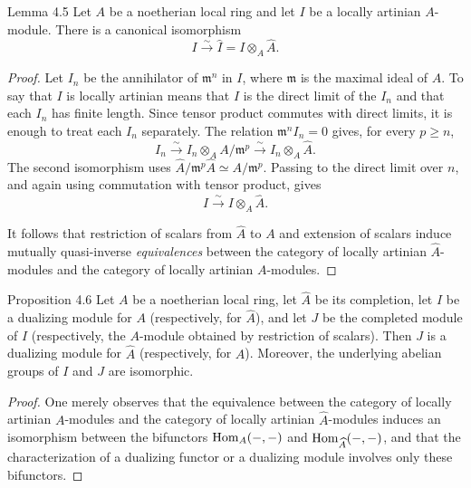 \begin{sgastatement}{Lemma 4.5}
Let $A$ be a noetherian local ring and let $I$ be a locally artinian
$A$-module. There is a canonical isomorphism
\[
  I\xrightarrow{\sim}\widehat I=I\otimes_A\widehat A.
\]
\end{sgastatement}

\begin{proof}
Let $I_n$ be the annihilator of $\mathfrak m^n$ in $I$, where
$\mathfrak m$ is the maximal ideal of $A$. To say that $I$ is locally
artinian means that $I$ is the direct limit of the $I_n$ and that each
$I_n$ has finite length. Since tensor product commutes with direct
limits, it is enough to treat each $I_n$ separately. The relation
$\mathfrak m^nI_n=0$ gives, for every $p\geq n$,
\[
  I_n\xrightarrow{\sim}I_n\otimes_A A/\mathfrak m^p
      \xrightarrow{\sim}I_n\otimes_A\widehat A.
\]
The second isomorphism uses
$\widehat A/\mathfrak m^p\widehat A\simeq A/\mathfrak m^p$. Passing
to the direct limit over $n$, and again using commutation with tensor
product, gives
\[ I\xrightarrow{\sim}I\otimes_A\widehat A. \]

It follows that restriction of scalars from $\widehat A$ to
$A$ and extension of scalars induce mutually quasi-inverse
\emph{equivalences} between the category of locally artinian
$\widehat A$-modules and the category of locally artinian $A$-modules.
\end{proof}


\begin{sgastatement}{Proposition 4.6}
Let $A$ be a noetherian local ring, let $\widehat A$ be its completion,
let $I$ be a dualizing module for $A$ (respectively, for $\widehat A$), and
let $J$ be the completed module
of $I$ (respectively, the $A$-module obtained by restriction of scalars).
Then $J$ is a dualizing module for $\widehat A$ (respectively, for $A$).
Moreover, the underlying abelian groups of $I$ and $J$ are isomorphic.
\end{sgastatement}

\begin{proof}
One merely observes that the equivalence between the category of locally
artinian $A$-modules and the category of locally artinian
$\widehat A$-modules induces an isomorphism between the bifunctors
$\operatorname{Hom}_A(-,-)$ and $\operatorname{Hom}_{\widehat A}(-,-)$, and that the
characterization of a dualizing functor or a dualizing module involves only
these bifunctors.
\end{proof}

